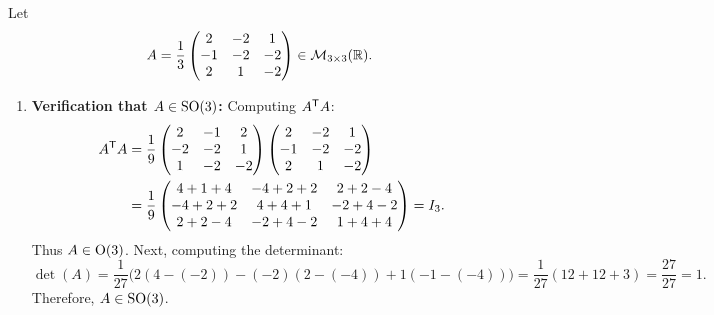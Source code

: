 \begin{exercisesolution}
\label{sol:rotation_matrix_axis_angle}
Let
\[
A = \frac{1}{3} \begin{pmatrix} 2 & -2 & 1 \\ -1 & -2 & -2 \\ 2 & 1 & -2 \end{pmatrix} \in \mathcal{M}_{3 \times 3}(\mathbb{R}).
\]
\begin{enumerate}[label=\textbf{(\alph*)}]
    \item \textbf{Verification that $A \in \operatorname{SO}(3)$:}
    Computing $A^{\mathsf{T}} A$:
    \begin{align*}
    A^{\mathsf{T}} A &= \frac{1}{9} \begin{pmatrix} 2 & -1 & 2 \\ -2 & -2 & 1 \\ 1 & -2 & -2 \end{pmatrix} \begin{pmatrix} 2 & -2 & 1 \\ -1 & -2 & -2 \\ 2 & 1 & -2 \end{pmatrix} \\
    &= \frac{1}{9} \begin{pmatrix} 4+1+4 & -4+2+2 & 2+2-4 \\ -4+2+2 & 4+4+1 & -2+4-2 \\ 2+2-4 & -2+4-2 & 1+4+4 \end{pmatrix} = I_3.
    \end{align*}
    Thus $A \in \operatorname{O}(3)$. Next, computing the determinant:
    \[
    \det(A) = \frac{1}{27} \Big( 2(4 - (-2)) - (-2)(2 - (-4)) + 1(-1 - (-4)) \Big) = \frac{1}{27}(12 + 12 + 3) = \frac{27}{27} = 1.
    \]
    Therefore, $A \in \operatorname{SO}(3)$.


\end{enumerate}
\end{exercisesolution}
